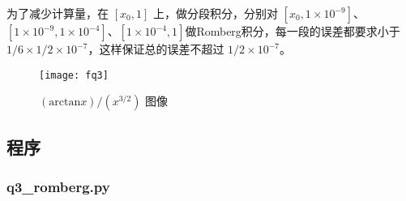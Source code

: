 为了减少计算量，在 $[x_0, 1]$ 上，做分段积分，分别对 $[x_0,1\times 10^{-9}]$、$[1\times 10^{-9},1\times 10^{-4}]$、$[1\times 10^{-4},1]$做Romberg积分，每一段的误差都要求小于 $1/6 \times 1/2 \times 10^{-7}$，这样保证总的误差不超过 $ 1/2 \times 10^{-7}$。

\begin{figure}[ht]
    \centering
      \texttt{[image: fq3]}
      \caption{$(\mathrm{arctan}x)/(x^{3/2})$ 图像}
      \label{fig:f}
\end{figure}

\subsection{程序}

\subsubsection{q3\_romberg.py}

